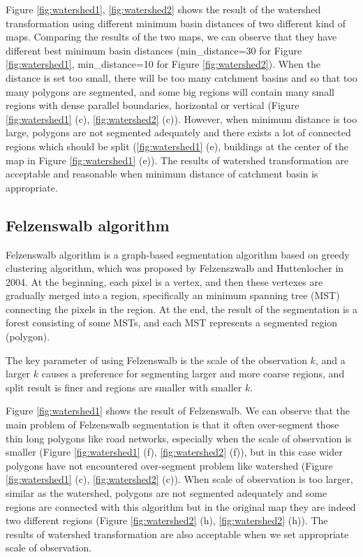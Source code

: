 \documentclass[12pt]{article}
\begin{document}
Figure \ref{fig:watershed1}, \ref{fig:watershed2} shows the result of the watershed transformation using different minimum basin distances of two different kind of maps. Comparing the results of the two maps, we can observe that they have different best minimum basin distances (min\_distance=30 for Figure \ref{fig:watershed1}, min\_distance=10 for Figure \ref{fig:watershed2}). When the distance is set too small, there will be too many catchment basins and so that too many polygons are segmented, and some big regions will contain many small regions with dense parallel boundaries, horizontal or vertical (Figure \ref{fig:watershed1} (c), \ref{fig:watershed2} (c)). However, when minimum distance is too large, polygons are not segmented adequately and there exists a lot of connected regions which should be split (\ref{fig:watershed1} (e), buildings at the center of the map in Figure \ref{fig:watershed1} (e)). The results of watershed transformation are acceptable and reasonable when minimum distance of catchment basin is appropriate.


\subsection{Felzenswalb algorithm}

Felzenswalb algorithm is a graph-based segmentation algorithm based on greedy clustering algorithm, which was proposed by Felzenszwalb and Huttenlocher in 2004\cite{felzenszwalb2004efficient}. At the beginning, each pixel is a vertex, and then these vertexes are gradually merged into a region, specifically an minimum spanning tree (MST) connecting the pixels in the region\cite{boykov2006graph}. At the end, the result of the segmentation is a forest consisting of some MSTs, and each MST represents a segmented region (polygon).

The key parameter of using Felzenswalb is the scale of the observation $k$, and a larger $k$ causes a preference for segmenting larger and more coarse regions, and split result is finer and regions are smaller with smaller $k$.  

Figure \ref{fig:watershed1} shows the result of Felzenswalb. We can observe that the main problem of Felzenswalb segmentation is that it often over-segment those thin long polygons like road networks, especially when the scale of observation is smaller (Figure \ref{fig:watershed1} (f), \ref{fig:watershed2} (f)), but in this case wider polygons have not encountered over-segment problem like watershed (Figure \ref{fig:watershed1} (c), \ref{fig:watershed2} (c)). When scale of observation is too larger, similar as the watershed, polygons are not segmented adequately and some regions are connected with this algorithm but in the original map they are indeed two different regions (Figure \ref{fig:watershed2} (h), \ref{fig:watershed2} (h)). The results of watershed transformation are also acceptable when we set appropriate scale of observation.
\end{document}
